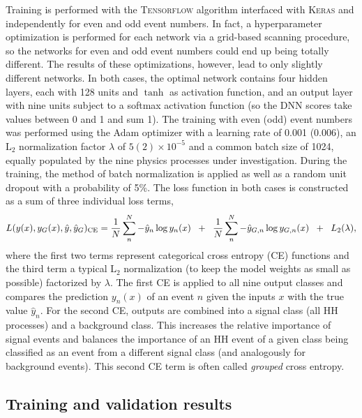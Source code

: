 \documentclass[../main.tex]{subfiles}
\begin{document}
Training is performed with the \textsc{Tensorflow} \cite{hh:analysis:tensorflow} algorithm interfaced with \textsc{Keras} \cite{hh:analysis:keras} and independently for even and odd event numbers. In fact, a hyperparameter optimization is performed for each network via a grid-based scanning procedure, so the networks for even and odd event numbers could end up being totally different. The results of these optimizations, however, lead to only slightly different networks. In both cases, the optimal network contains four hidden layers, each with 128 units and $\tanh$ as activation function, and an output layer with nine units subject to a softmax activation function (so the DNN scores take values between 0 and 1 and sum 1). The training with even (odd) event numbers was performed using the Adam optimizer with a learning rate of 0.001 (0.006), an $\text{L}_2$ normalization factor $\lambda$ of $5(2)\times 10^{-5}$ and a common batch size of 1024, equally populated by the nine physics processes under investigation. During the training, the method of batch normalization is applied as well as a random unit dropout with a probability of 5\%. The loss function in both cases is constructed as a sum of three individual loss terms,
\begin{equation}
 L(y(x), y_G(x), \hat{y}, \hat{y}_G)_\text{CE} = \frac{1}{N} \sum_n^N -\hat{y}_n \log{y_n(x)} \hspace{2mm} + \hspace{2mm} \frac{1}{N} \sum_n^N -\hat{y}_{G,n} \log{y_{G,n}(x)} \hspace{2mm} + \hspace{2mm} L_2(\lambda),
\end{equation}
where the first two terms represent categorical cross entropy (CE) functions and the third term a typical $\text{L}_2$ normalization (to keep the model weights as small as possible) factorized by $\lambda$. The first CE is applied to all nine output classes and compares the prediction $y_n(x)$ of an event $n$ given the inputs $x$ with the true value $\hat{y}_n$. For the second CE, outputs are combined into a signal class (all HH processes) and a background class. This increases the relative importance of signal events and balances the importance of an HH event of a given class being classified as an event from a different signal class (and analogously for background events).  This second CE term is often called \textit{grouped} cross entropy.



\subsection{Training and validation results}
\end{document}
